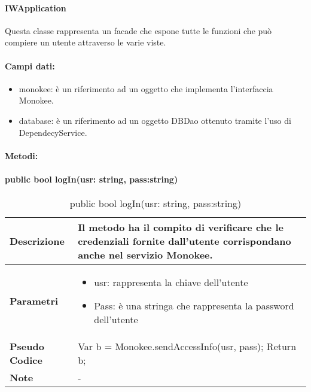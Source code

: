 \paragraph{IWApplication}
Questa classe rappresenta un facade che espone tutte le funzioni che può compiere un utente attraverso le varie viste.
\paragraph{Campi dati:}
\begin{itemize}
    \item monokee: è un riferimento ad un oggetto che implementa l’interfaccia Monokee.
    \item database: è un riferimento ad un oggetto DBDao ottenuto tramite l’uso di DependecyService.
\end{itemize}

\paragraph{Metodi:}

\paragraph{public bool logIn(usr: string, pass:string)}
\begin{center}
    \begin{longtable}{|p{3cm}|p{9cm}|}%
    \caption{public bool logIn(usr: string, pass:string)}
    \endfirsthead
    \endhead
    \hline
    \textbf{Descrizione} & Il metodo ha il compito di verificare che le credenziali fornite dall’utente corrispondano anche nel servizio Monokee.\\
    \hline
    \textbf{Parametri} &      
    \begin{itemize}
        \item  usr: rappresenta la chiave dell’utente
        \item Pass: è una stringa che rappresenta la password dell’utente
    \end{itemize}
    \\
    \hline
    \textbf{Pseudo Codice} & 
    Var b = Monokee.sendAccessInfo(usr, pass);\newline
    Return b;\newline
    \\
    \hline
    \textbf{Note} & 
    -
    \\
    \hline
    \end{longtable}
    \end{center}


